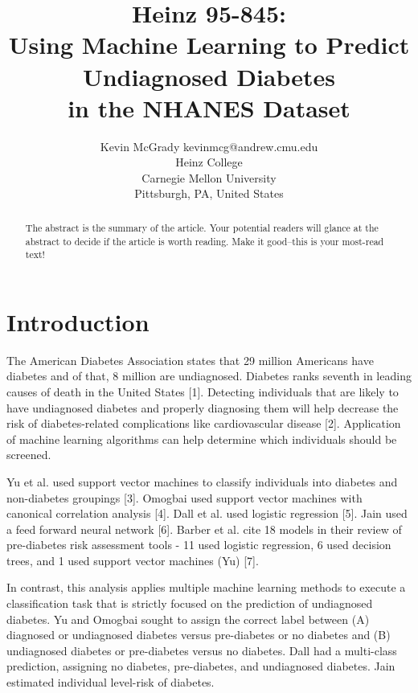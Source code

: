 \documentclass[twoside,11pt]{article}
\begin{document}
\title{Heinz 95-845: \\Using Machine Learning to Predict Undiagnosed Diabetes \\in the NHANES Dataset}

\author{\name Kevin McGrady \email kevinmcg@andrew.cmu.edu \\
       \addr Heinz College\\
       Carnegie Mellon University\\
       Pittsburgh, PA, United States} 

\maketitle

\begin{abstract}
  The abstract is the summary of the article. Your potential readers will glance at the abstract to decide
  if the article is worth reading. Make it good--this is your most-read text!  
\end{abstract}

\section{Introduction}
The American Diabetes Association states that 29 million Americans have diabetes and of that, 8 million are undiagnosed. Diabetes ranks seventh in leading causes of death in the United States [1]. Detecting individuals that are likely to have undiagnosed diabetes and properly diagnosing them will help decrease the risk of diabetes-related complications like cardiovascular disease [2]. Application of machine learning algorithms can help determine which individuals should be screened. 

Yu et al. used support vector machines to classify individuals into diabetes and non-diabetes groupings [3]. Omogbai used support vector machines with canonical correlation analysis [4]. Dall et al. used logistic regression [5]. Jain used a feed forward neural network [6]. Barber et al. cite 18 models in their review of pre-diabetes risk assessment tools - 11 used logistic regression, 6 used decision trees, and 1 used support vector machines (Yu) [7].

In contrast, this analysis applies multiple machine learning methods to execute a classification task that is strictly focused on the prediction of undiagnosed diabetes. Yu and Omogbai sought to assign the correct label between (A) diagnosed or undiagnosed diabetes versus pre-diabetes or no diabetes and (B) undiagnosed diabetes or pre-diabetes versus no diabetes. Dall had a multi-class prediction, assigning no diabetes, pre-diabetes, and undiagnosed diabetes. Jain estimated individual level-risk of diabetes.
\end{document}
